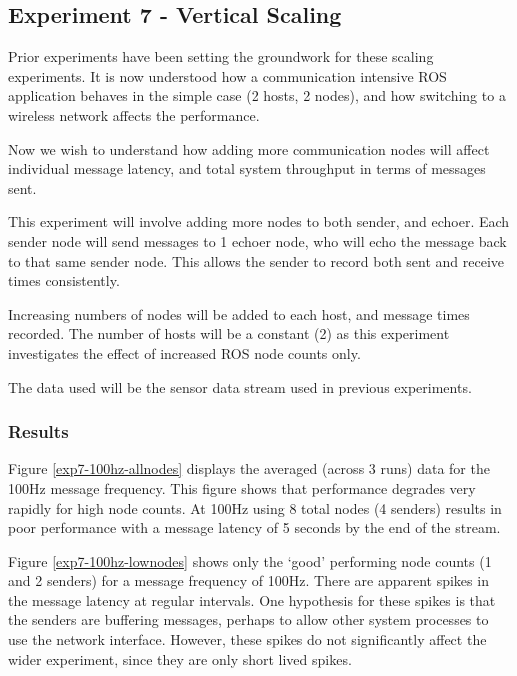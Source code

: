 \documentclass[../dissertation.tex]{subfiles}
\begin{document}
\subsection{Experiment 7 - Vertical Scaling}
\label{experiment7-vertical-scaling}

Prior experiments have been setting the groundwork for these scaling experiments. It is now understood how a communication intensive ROS application behaves in the simple case (2 hosts, 2 nodes), and how switching to a wireless network affects the performance.

Now we wish to understand how adding more communication nodes will affect individual message latency, and total system throughput in terms of messages sent.

This experiment will involve adding more nodes to both sender, and echoer. Each sender node will send messages to 1 echoer node, who will echo the message back to that same sender node. This allows the sender to record both sent and receive times consistently.

Increasing numbers of nodes will be added to each host, and message times recorded. The number of hosts will be a constant (2) as this experiment investigates the effect of increased ROS node counts only.

The data used will be the sensor data stream used in previous experiments.

\subsubsection{Results}

Figure \ref{exp7-100hz-allnodes} displays the averaged (across 3 runs) data for the 100Hz message frequency. This figure shows that performance degrades very rapidly for high node counts. At 100Hz using 8 total nodes (4 senders) results in poor performance with a message latency of 5 seconds by the end of the stream. 

Figure \ref{exp7-100hz-lownodes} shows only the `good' performing node counts (1 and 2 senders) for a message frequency of 100Hz. There are apparent spikes in the message latency at regular intervals. One hypothesis for these spikes is that the senders are buffering messages, perhaps to allow other system processes to use the network interface. However, these spikes do not significantly affect the wider experiment, since they are only short lived spikes.
\end{document}
